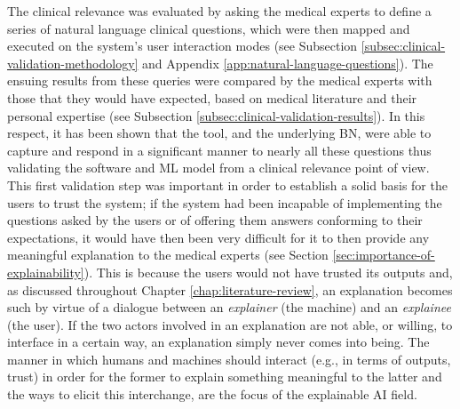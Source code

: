 The clinical relevance was evaluated by asking the medical experts to define a series of natural language clinical questions, which were then mapped and executed on the system's user interaction modes (see Subsection \ref{subsec:clinical-validation-methodology} and Appendix \ref{app:natural-language-questions}).
The ensuing results from these queries were compared by the medical experts with those that they would have expected, based on medical literature and their personal expertise (see Subsection \ref{subsec:clinical-validation-results}).
In this respect, it has been shown that the tool, and the underlying BN, were able to capture and respond in a significant manner to nearly all these questions thus validating the software and ML model from a clinical relevance point of view.
This first validation step was important in order to establish a solid basis for the users to trust the system; if the system had been incapable of implementing the questions asked by the users or of offering them answers conforming to their expectations, it would have then been very difficult for it to then provide any meaningful explanation to the medical experts (see Section \ref{sec:importance-of-explainability}).
This is because the users would not have trusted its outputs and, as discussed throughout Chapter \ref{chap:literature-review}, an explanation becomes such by virtue of a dialogue between an \textit{explainer} (the machine) and an \textit{explainee} (the user).
If the two actors involved in an explanation are not able, or willing, to interface in a certain way, an explanation simply never comes into being.
The manner in which humans and machines should interact (e.g., in terms of outputs, trust) in order for the former to explain something meaningful to the latter and the ways to elicit this interchange, are the focus of the explainable AI field.

